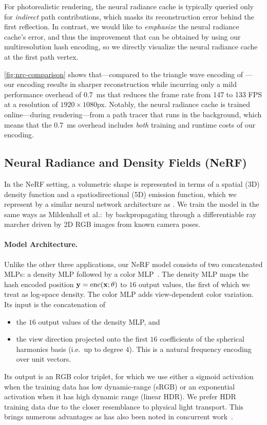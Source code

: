 \documentclass[acmtog,authorversion]{acmart}
\begin{document}
For photorealistic rendering, the neural radiance cache is typically queried only for \emph{indirect} path contributions, which masks its reconstruction error behind the first reflection.
In contrast, we would like to \emph{emphasize} the neural radiance cache's error, and thus the improvement that can be obtained by using our multiresolution hash encoding, so we directly visualize the neural radiance cache at the first path vertex.

\autoref{fig:nrc-comparison} shows that---compared to the triangle wave encoding of \citet{mueller2021realtime}---our encoding results in sharper reconstruction while incurring only a mild performance overhead of \SI{0.7}{\milli\second} that reduces the frame rate from \num{147} to \num{133} FPS at a resolution of $1920\times1080$px.
Notably, the neural radiance cache is trained online---during rendering---from a path tracer that runs in the background, which means that the \SI{0.7}{\milli\second} overhead includes \emph{both} training and runtime costs of our encoding.



\subsection{Neural Radiance and Density Fields (NeRF)}\label{Sec:Experiments:nerf}

In the NeRF setting, a volumetric shape is represented in terms of a spatial (3D) density function and a spatiodirectional (5D) emission function, which we represent by a similar neural network architecture as \citet{mildenhall2020nerf}.
We train the model in the same ways as Mildenhall et al.:\ by backpropagating through a differentiable ray marcher driven by 2D RGB images from known camera poses.

\paragraph{Model Architecture.}
Unlike the other three applications, our NeRF model consists of two concatenated MLPs: a density MLP followed by a color MLP~\citep{mildenhall2020nerf}.
The density MLP maps the hash encoded position ${\mathbf{y} = \mathrm{enc}(\mathbf{x}; \theta)}$ to $16$ output values, the first of which we treat as log-space density.
The color MLP adds view-dependent color variation.
Its input is the concatenation of
\begin{itemize}[leftmargin=*]
  \item the $16$ output values of the density MLP, and
  \item the view direction projected onto the first $16$ coefficients of the spherical harmonics basis (i.e.\ up to degree $4$). This is a natural frequency encoding over unit vectors.
\end{itemize}
Its output is an RGB color triplet, for which we use either a sigmoid activation when the training data has low dynamic-range (sRGB) or an exponential activation when it has high dynamic range (linear HDR).
We prefer HDR training data due to the closer resemblance to physical light transport.
This brings numerous advantages as has also been noted in concurrent work~\cite{mildenhall2021nerf}.
\end{document}

